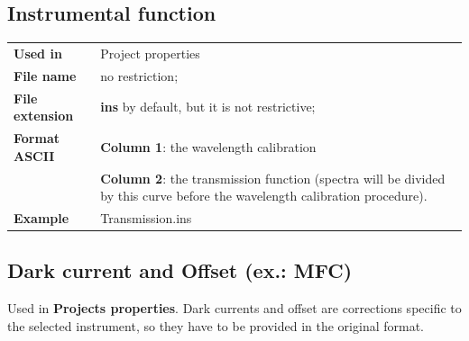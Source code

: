 \subsection{Instrumental function}\hfill
\begin{minipage}[t]{\textwidth}
\vspace{-0.6\baselineskip}
\begin{tabular}[h]{l p{8cm}}
\textbf{Used in} & Project properties \\ [6pt]
\textbf{File name} & no restriction; \\ [6pt]
\textbf{File extension} & \textbf{ins} by default, but it is not restrictive; \\ [6pt]
\textbf{Format ASCII} & \textbf{Column 1}: the wavelength calibration \\
                      & \textbf{Column 2}: the transmission function (spectra will be divided by this curve before the wavelength calibration procedure).\\ [6pt]
\textbf{Example} & Transmission.ins
\end{tabular}
\end{minipage}


\subsection{Dark current and Offset (ex.: MFC)}
Used in \textbf{Projects properties}.  Dark currents and offset are corrections specific to the selected instrument, so they have to be provided in the original format.

